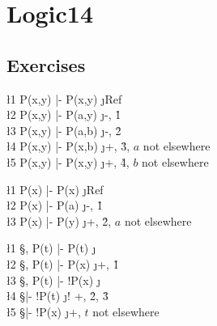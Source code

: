 \documentclass[class=cs245,leqno]{agony}
\begin{document}
\section{Logic14}

\subsection{Exercises}

\begin{xca}
\end{xca}
\begin{prf}
  \begin{deduce}
    \l1 \A[x]\A[y] P(x,y) |- \A[x]\A[y] P(x,y) \j {Ref}                          \\
    \l2 \A[x]\A[y] P(x,y) |- \A[y] P(a,y)      \j {\A -, \r1}                    \\
    \l3 \A[x]\A[y] P(x,y) |- P(a,b)            \j {\A -, \r2}                    \\
    \l4 \A[x]\A[y] P(x,y) |- \A[x] P(x,b)      \j {\A +, \r3, $a$ not elsewhere} \\
    \l5 \A[x]\A[y] P(x,y) |- \A[y] P(x,y)      \j {\A +, \r4, $b$ not elsewhere}
  \end{deduce}
\end{prf}

\begin{xca}
\end{xca}
\begin{prf}
  \begin{deduce}
    \l1 \A[x] P(x) |- \A[x] P(x) \j {Ref}                          \\
    \l2 \A[x] P(x) |- P(a)       \j {\A -, \r1}                    \\
    \l3 \A[x] P(x) |- \A[y] P(y) \j {\A +, \r2, $a$ not elsewhere}
  \end{deduce}
\end{prf}

\begin{xca}
\end{xca}
\begin{prf}
  \begin{deduce}
    \l1 \S, P(t) |- P(t)       \j {\E}                      \\
    \l2 \S, P(t) |- \X[x]P(x)  \j {\X +, \r1}               \\
    \l3 \S, P(t) |- !\X[x]P(x) \j {\E}                      \\
    \l4 \S       |- !P(t)      \j {! +, \r2, \r3}           \\
    \l5 \S       |- \A[x]!P(x) \j {\A +, $t$ not elsewhere}
  \end{deduce}
\end{prf}
\end{document}
